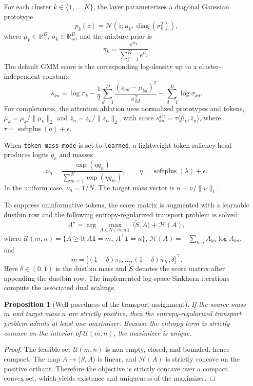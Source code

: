 \documentclass[journal]{IEEEtran}
\newtheorem{proposition}{Proposition}
\begin{document}
For each cluster \(k \in \{1,\dots,K\}\), the layer parameterizes a diagonal Gaussian prototype
\[
p_k(z) = \mathcal{N}(z; \mu_k, \operatorname{diag}(\sigma_k^2)),
\]
where \(\mu_k \in \mathbb{R}^D\), \(\sigma_k \in \mathbb{R}_+^D\), and the mixture prior is
\[
\pi_k = \frac{e^{\alpha_k}}{\sum_{j=1}^K e^{\alpha_j}}.
\]
The default GMM score is the corresponding log-density up to a cluster-independent constant:
\begin{equation}
s_{kn}
= \log \pi_k
-\frac{1}{2}\sum_{d=1}^D \frac{(z_{nd}-\mu_{kd})^2}{\sigma_{kd}^2}
-\sum_{d=1}^D \log \sigma_{kd}.
\label{eq:ot_score}
\end{equation}
For completeness, the attention ablation uses normalized prototypes and tokens, \(\bar{\mu}_k = \mu_k / \|\mu_k\|_2\) and \(\bar{z}_n = z_n / \|z_n\|_2\), with score \(s^{\mathrm{att}}_{kn} = \tau \langle \bar{\mu}_k, \bar{z}_n \rangle\), where \(\tau = \operatorname{softplus}(a) + \epsilon\).

When \texttt{token\_mass\_mode} is set to \texttt{learned}, a lightweight token saliency head produces logits \(q_n\) and masses
\[
\nu_n = \frac{\exp(\eta q_n)}{\sum_{m=1}^N \exp(\eta q_m)},
\qquad \eta = \operatorname{softplus}(\lambda) + \epsilon.
\]
In the uniform case, \(\nu_n = 1/N\). The target mass vector is \(n = \nu / \|\nu\|_1\).

To suppress uninformative tokens, the score matrix is augmented with a learnable dustbin row and the following entropy-regularized transport problem is solved:
\[
A^\star = \arg\max_{A \in \mathcal{U}(m,n)} \langle \tilde{S}, A \rangle + \mathcal{H}(A),
\]
where \(\mathcal{U}(m,n) = \{A \ge 0 : A\mathbf{1} = m,\ A^\top\mathbf{1} = n\}\), \(\mathcal{H}(A) = -\sum_{k,n} A_{kn}\log A_{kn}\), and
\[
m = \big[(1-\delta)\pi_1,\ldots,(1-\delta)\pi_K,\delta\big]^\top.
\]
Here \(\delta \in (0,1)\) is the dustbin mass and \(\tilde{S}\) denotes the score matrix after appending the dustbin row. The implemented log-space Sinkhorn iterations compute the associated dual scalings.

\begin{proposition}[Well-posedness of the transport assignment]
If the source mass \(m\) and target mass \(n\) are strictly positive, then the entropy-regularized transport problem admits at least one maximizer. Because the entropy term is strictly concave on the interior of \(\mathcal{U}(m,n)\), the maximizer is unique.
\end{proposition}
\begin{proof}
The feasible set \(\mathcal{U}(m,n)\) is non-empty, closed, and bounded, hence compact. The map \(A \mapsto \langle \tilde{S}, A \rangle\) is linear, and \(\mathcal{H}(A)\) is strictly concave on the positive orthant. Therefore the objective is strictly concave over a compact convex set, which yields existence and uniqueness of the maximizer.
\end{proof}
\end{document}
